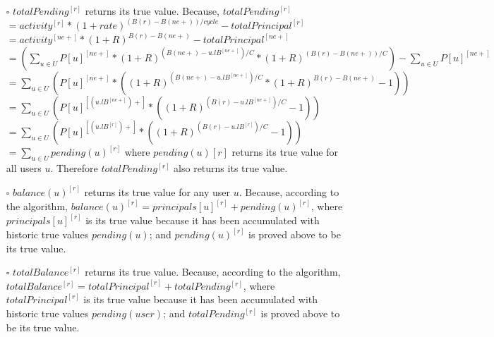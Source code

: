 \documentclass{article}
\begin{document}
\begin{itemize}
\begin{itemize}
    \item[$\square$] { $ totalPending^{[r]} $ returns its true value.}
    \newline \newline
    Because, $ totalPending^{[r]} $
    \newline \newline
    $ = activity^{[r]} * (1+rate)^{(B(r)-B(ne+))/cycle} - totalPrincipal^{[r]} $
    \newline \newline
    $ = activity^{[ne+]} * (1+R)^{B(r)-B(ne+)} - totalPrincipal^{[ne+]} $
    \newline \newline
    $ = (\sum_{u \in U} P[u]^{[ne+]} * (1+R )^{(B(ne+)-u.lB^{[ne+]})/C} * (1+R)^{(B(r)-B(ne+))/C}) - \sum_{u \in U} P[u]^{[ne+]} $
    \newline \newline
    $ = \sum_{u \in U} ( P[u]^{[ne+]} * ((1+R )^{(B(ne+)-u.lB^{[ne+]})/C} * (1+R)^{B(r)-B(ne+)} - 1) )$
    \newline \newline
    $ = \sum_{u \in U} ( P[u]^{[(u.lB^{[ne+]})+]} * ((1+R )^{(B(r)-u.lB^{[ne+]})/C} - 1) )$
    \newline \newline
    $ = \sum_{u \in U} ( P[u]^{[(u.lB^{[r]})+]} * ((1+R )^{(B(r)-u.lB^{[r]})/C} - 1) )$
    \newline \newline
    $ = \sum_{u \in U} pending(u)^{[r]} $
    \newline \newline
    where $pending(u){[r]}$ returns its true value for all users $u$.
    Therefore $ totalPending^{[r]} $ also returns its true value.

    \item[$\square$] { $ balance(u)^{[r]}$ returns its true value for any user $u$.} \newline
    Because, according to the algorithm, $balance(u)^{[r]} = principals[u]^{[r]} + pending(u)^{[r]}$,
    where $principals[u]^{[r]}$ is its true value  
    because it has been accumulated with historic true values $pending(u)$;
    and $pending(u)^{[r]}$ is proved above to be its true value.
   
    \item[$\square$] { $ totalBalance^{[r]} $ returns its true value.} \newline
    Because, according to the algorithm, $totalBalance^{[r]} = totalPrincipal^{[r]} + totalPending^{[r]}$,
    where $totalPrincipal^{[r]}$ is its true value 
    because it has been accumulated with historic true values $pending(user)$;
    and $totalPending^{[r]}$ is proved above to be its true value.


\end{itemize}
\end{itemize}
\end{document}
